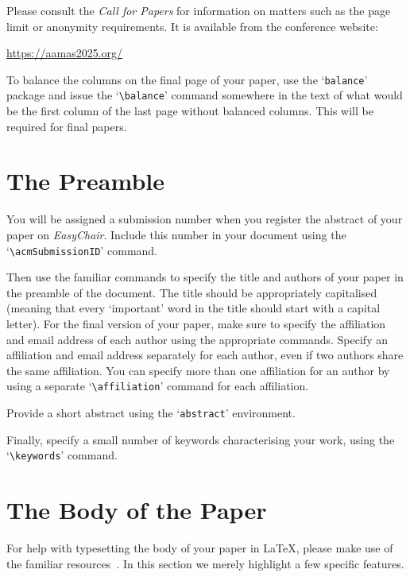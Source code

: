 \documentclass[sigconf,anonymous]{aamas}
\begin{document}
Please consult the \emph{Call for Papers} for information on matters
such as the page limit or anonymity requirements. It is available from
the conference website:
%
\begin{center}
  \url{https://aamas2025.org/}
\end{center}
%
To balance the columns on the final page of your paper, use the
`\texttt{balance}' package and issue the `\verb|\balance|' command
somewhere in the text of what would be the first column of the last
page without balanced columns. This will be required for final papers.


\section{The Preamble}

You will be assigned a submission number when you register the abstract
of your paper on \textit{EasyChair}. Include this number in your
document using the `\verb|\acmSubmissionID|' command.

Then use the familiar commands to specify the title and authors of your
paper in the preamble of the document. The title should be appropriately
capitalised (meaning that every `important' word in the title should
start with a capital letter). For the final version of your paper, make
sure to specify the affiliation and email address of each author using
the appropriate commands. Specify an affiliation and email address
separately for each author, even if two authors share the same
affiliation. You can specify more than one affiliation for an author by
using a separate `\verb|\affiliation|' command for each affiliation.

Provide a short abstract using the `\texttt{abstract}' environment.

Finally, specify a small number of keywords characterising your work,
using the `\verb|\keywords|' command.


\section{The Body of the Paper}

For help with typesetting the body of your paper in \LaTeX\@, please
make use of the familiar resources~\cite{Lam94}. In this section we
merely highlight a few specific features.
\end{document}
